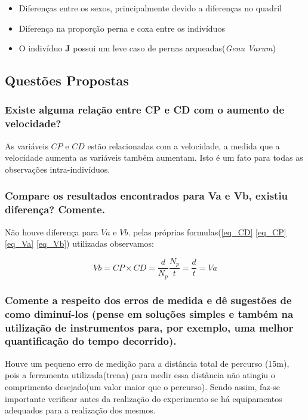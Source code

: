 \documentclass[a4paper,10pt]{article}
\begin{document}
\begin{itemize}
 \item Diferenças entre os sexos, principalmente devido a diferenças no quadril 
 \item Diferença na proporção perna e coxa entre os indivíduos
 \item O indivíduo \textbf{J} possui um leve caso de pernas arqueadas(\textit{Genu Varum})
\end{itemize}


\subsection{Questões Propostas}
\subsubsection{Existe alguma relação entre CP e CD com o aumento de velocidade?}
As variáveis $CP$ e $CD$ estão relacionadas com a velocidade, a medida que a velocidade aumenta as variáveis também aumentam. Isto é um fato para todas as observações intra-indivíduos.

\subsubsection{Compare os resultados encontrados para Va e Vb, existiu diferença? Comente.}
Não houve diferença para $Va$ e $Vb$. pelas próprias formulas(\ref{eq_CD} \ref{eq_CP} \ref{eq_Va} \ref{eq_Vb}) utilizadas observamos:

\begin{equation}
   Vb = CP \times CD = \frac{d}{N_p} \frac{N_p}{t} = \frac{d}{t} = Va
\end{equation}

\subsubsection{Comente a respeito dos erros de medida e dê sugestões de como diminuí-los (pense em soluções simples e também na utilização de instrumentos para, por exemplo, uma melhor quantificação do tempo decorrido).}

Houve um pequeno erro de medição para a distância total de percurso (15m), pois a ferramenta utilizada(trena) para medir essa distância não atingiu o comprimento desejado(um valor maior que o percurso). Sendo assim, faz-se importante verificar antes da realização do experimento se há equipamentos adequados para a realização dos mesmos.
\end{document}
